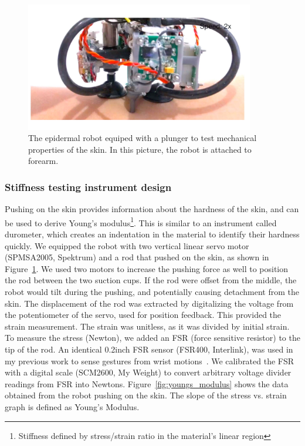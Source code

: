 \begin{figure}[!t]
\centering
\includegraphics[width=10.0cm]{pictures/applications/pushing_robot.pdf}
\caption{The epidermal robot equiped with a plunger to test mechanical properties of the skin. In this picture, the robot is attached to forearm.}
\label{fig:pushing_robot}
\end{figure}


\subsubsection{Stiffness testing instrument design}
Pushing on the skin provides information about the hardness of the skin, and can be used to derive Young's modulus\footnote{Stiffness defined by stress/strain ratio in the material's linear region}.  This is similar to an instrument called durometer, which creates an indentation in the material to identify their hardness quickly. We equipped the robot with two vertical linear servo motor (SPMSA2005, Spektrum) and a rod that pushed on the skin, as shown in Figure~\ref{fig:pushing_robot}. We used two motors to increase the pushing force as well to position the rod between the two suction cups. If the rod were offset from the middle, the robot would tilt during the pushing, and potentially causing detachment from the skin. 
The displacement of the rod was extracted by digitalizing the voltage from the potentiometer of the servo, used for position feedback. This provided the strain measurement. The strain was unitless, as it was divided by initial strain. To measure the stress (Newton), we added an FSR (force sensitive resistor) to the tip of the rod. An identical 0.2inch FSR sensor (FSR400, Interlink), was used in my previous work to sense gestures from wrist motions~\cite{dementyev2014wristflex}. We calibrated the FSR with a digital scale (SCM2600, My Weight) to convert arbitrary voltage divider readings from FSR into Newtons.
Figure~\ref{fig:youngs_modulus} shows the data obtained from the robot pushing on the skin. The slope of the stress vs. strain graph is defined as Young's Modulus. 

